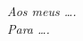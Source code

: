 \clearpage
\vspace*{0.7\textheight}
\begin{flushright}
    \emph{
    Aos meus \ldots. \\
    Para \ldots.} 
\end{flushright}
